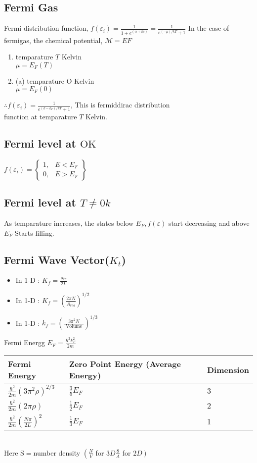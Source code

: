 \subsection{Fermi Gas}
Fermi distribution function, $f\left(\varepsilon_{i}\right)=\frac{1}{1+e^{(\alpha+\beta \varepsilon)}}=\frac{1}{e^{(-\mu) / k T}+1}$ In the case of fermigas, the chemical potential, $\mathcal{M}=E F$
\begin{enumerate}[label=\roman*)]
	\item temparature $T$ Kelvin\\
	$\mu=E_{F}(T)$
	\item (a) temparature O Kelvin\\
	$
	\mu=E_{F}(0)
	$
\end{enumerate}
$\therefore f\left(\varepsilon_{i}\right)=\frac{1}{e^{\left(k-k_{F}\right) / k T}+1}$, This is fermiddirac distribution\\
function at temparature $T$ Kelvin.
\subsection{Fermi level at $\mathrm{OK}$}
$f\left(\varepsilon_{i}\right)=\left\{\begin{array}{ll}1, & E<E_{F} \\ 0, & E>E_{F}\end{array}\right\}$
\subsection{Fermi level at $T \neq 0 k$}
As temparature increases, the states below $E_{F}, f(\varepsilon)$ start decreasing and above $E_{F}$ Starts filling.
\subsection{Fermi Wave Vector($K_t$)}
\begin{itemize}
	\item In 1-D : $K_{f}=\frac{N \pi}{2 L}$
	\item  In 1-D : $K_{f}=\left(\frac{2 \pi N}{A_{r e a}}\right)^{1 / 2}$
	\item  In 1-D : $k_{f}=\left(\frac{3 \pi^{2} N}{\text { Volume }}\right)^{1 / 3}$
\end{itemize}
Fermi Energg $E_{F}=\frac{\hbar^{2} k_{F}^{2}}{2 m}$\\
\renewcommand*{\arraystretch}{2}
\begin{tabular}{|p{4cm}|p{4cm}|p{3cm}|}
	\hline
	Fermi Energy&Zero Point Energy (Average Energy)&Dimension\\\hline
	$\frac{\hbar^{2}}{2 m}\left(3 \pi^{2} \rho\right)^{2 / 3}$&$\frac{3}{5} E_{F}$&3\\
	$\frac{\hbar^{2}}{2 m}(2 \pi \rho)$&$\frac{1}{2} E_{F}$&2\\
	$\frac{\hbar^{2}}{2 m}\left(\frac{N \pi}{2 L}\right)^{2}$&$\frac{1}{3} E_{F}$& 1\\\hline
\end{tabular}\\
Here $\mathrm{S}=$number density $\left(\frac{N}{V}\right.$ for $3 D \frac{8}{A}$ for $\left.2 D\right)$
